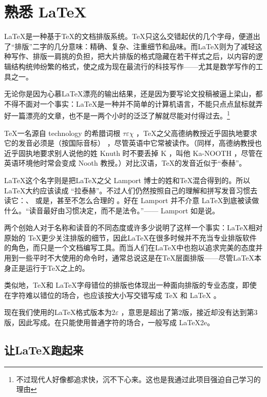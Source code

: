 \chapter{熟悉 \LaTeX}

\LaTeX 是一种基于\TeX 的文档排版系统。\TeX 只这么交错起伏的几个字母，便道出了“排版”二字的几分意味：精确、复杂、注重细节和品味。而\LaTeX 则为了减轻这种写作、排版一肩挑的负担，把大片排版的格式隐藏在若干样式之后，以内容的逻辑结构统帅纷繁的格式，使之成为现在最流行的科技写作——尤其是数学写作的工具之一。

无论你是因为心慕\LaTeX 漂亮的输出结果，还是因为要写论文投稿被逼上梁山，都不得不面对一个事实：\LaTeX 是一种并不简单的计算机语言，不能只点点鼠标就弄好一篇漂亮的文章，也不是一两个小时的泛泛了解就尽能对付得过去。\footnote{不过现代人好像都追求快，沉不下心来。这也是我通过此项目强迫自己学习的理由}

{
    \qquad \TeX 一名源自 technology 的希腊词根 $\tau \varepsilon \chi$ ，\TeX 之父高德纳教授近乎固执地要求它的发音必须是（按国际音标） \textipa{[tEx]}，尽管英语中它常被读作\textipa{[tEk]}。（同样，高德纳教授也近乎固执地要求别人说他的姓 Knuth 时不要丢掉 K ，叫他 Ka-NOOTH ，尽管在英语环境他时常会变成 Nooth 教授。）对比汉语，\TeX 的发音近似于“泰赫”。
    
    \qquad \LaTeX 这个名字则是把\LaTeX 之父 Lamport 博士的姓和\TeX 混合得到的。所以\LaTeX 大约应该读成 “拉泰赫”。不过人们仍然按照自己的理解和拼写发音习惯去读它：\textipa{["lA:tEk]}、\textipa{["leItEk]} 或是\textipa{[lA:"tEk]}，甚至不怎么合理的  \textipa{["leItEks]} \footnotemark 。好在 Lamport 并不介意 \LaTeX 到底被读做什么。“读音最好由习惯决定，而不是法令。”—— Lamport 如是说。

    \qquad 两个创始人对于名称和读音的不同态度或许多少说明了这样一个事实：\LaTeX 相对原始的 \TeX 更少关注排版的细节，因此\LaTeX 在很多时候并不充当专业排版软件的角色，而只是一个文档编写工具。而当人们在\LaTeX 中也抱以追求完美的态度并用到一些平时不大使用的命令时，通常总说这是在\TeX 层面排版——尽管\LaTeX 本身正是运行于\TeX 之上的。

    \qquad 类似地，\TeX 和 \LaTeX 字母错位的排版也体现出一种面向排版的专业态度，即使在字符难以错位的场合，也应该按大小写交错写成 TeX 和 LaTeX 。

    \qquad 现在我们使用的\LaTeX 格式版本为$2\varepsilon$ ，意思是超出了第2版，接近却没有达到第3版，因此写成\LaTeXe。在只能使用普通字符的场合，一般写成 LaTeX2e。    
}


\section{让\LaTeX 跑起来}

